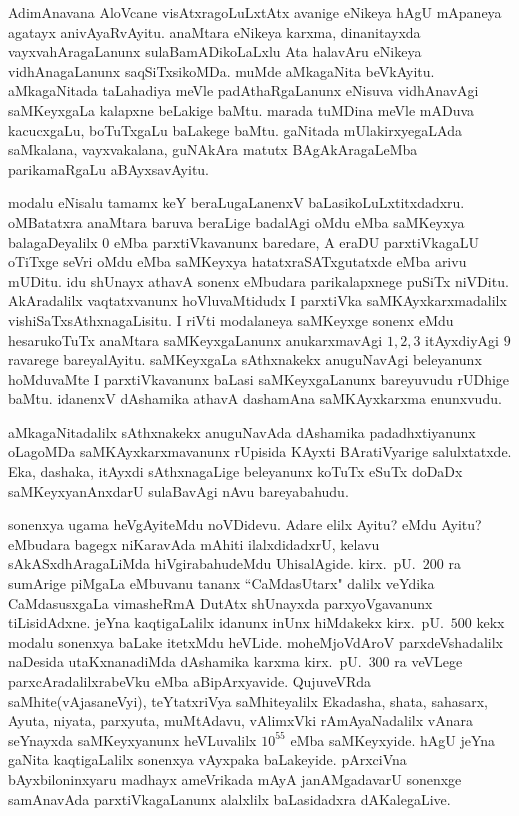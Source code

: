 AdimAnavana AloVcane visAtxragoLuLxtAtx avanige eNikeya hAgU mApaneya agatayx anivAyaRvAyitu. anaMtara eNikeya karxma, dinanitayxda vayxvahAragaLanunx sulaBamADikoLaLxlu Ata halavAru eNikeya vidhAnagaLanunx saqSiTxsikoMDa. muMde aMkagaNita beVkAyitu. aMkagaNitada taLahadiya meVle padAthaRgaLanunx eNisuva vidhAnavAgi saMKeyxgaLa  kalapxne beLakige baMtu. marada tuMDina meVle mADuva kacucxgaLu, boTuTxgaLu baLakege baMtu. gaNitada mUlakirxyegaLAda saMkalana, vayxvakalana, guNAkAra matutx BAgAkAragaLeMba parikamaRgaLu aBAyxsavAyitu.

modalu eNisalu tamamx keY beraLugaLanenxV baLasikoLuLxtitxdadxru. oMBatatxra anaMtara baruva beraLige badalAgi oMdu eMba saMKeyxya balagaDeyalilx $0$ eMba parxtiVkavanunx baredare, A eraDU parxtiVkagaLU oTiTxge seVri oMdu eMba saMKeyxya hatatxraSATxgutatxde eMba arivu  mUDitu. idu shUnayx athavA sonenx eMbudara parikalapxnege puSiTx niVDitu. AkAradalilx vaqtatxvanunx hoVluvaMtidudx I parxtiVka saMKAyxkarxmadalilx vishiSaTxsAthxnagaLisitu. I riVti modalaneya saMKeyxge sonenx eMdu hesarukoTuTx anaMtara saMKeyxgaLanunx anukarxmavAgi $1,2,3$ itAyxdi\-yAgi $9$ ravarege bareyalAyitu. saMKeyxgaLa sAthxnakekx anuguNavAgi beleyanunx hoMdu\-vaMte I parxtiVkavanunx baLasi saMKeyxgaLanunx bareyuvudu rUDhige baMtu. idanenxV dAshamika athavA dashamAna saMKAyxkarxma enunxvudu.

aMkagaNitadalilx sAthxnakekx anuguNavAda dAshamika padadhxtiyanunx oLagoMDa saMKAyxkarxmavanunx rUpisida KAyxti BAratiVyarige salulxtatxde. Eka, dashaka, itAyxdi sAthxnagaLige beleyanunx koTuTx eSuTx doDaDx saMKeyxyanAnxdarU sulaBavAgi nAvu bareyabahudu.

sonenxya ugama heVgAyiteMdu noVDidevu. Adare elilx Ayitu? eMdu Ayitu? eMbudara bagegx niKaravAda mAhiti ilalxdidadxrU, kelavu sAkASxdhAragaLiMda hiVgirabahudeMdu UhisalAgide. kirx.~pU.\ $200$ ra sumArige piMgaLa eMbuvanu tananx ``CaMdasUtarx" dalilx veYdika CaMdasusxgaLa vimasheRmA DutAtx shUnayxda parxyoVgavanunx tiLisidAdxne. jeYna kaqtigaLalilx idanunx inUnx hiMdakekx kirx.~pU.\ $500$ kekx modalu sonenxya baLake itetxMdu heVLide. moheMjoVdAroV parxdeVshadalilx naDesida utaKxnanadiMda dAshamika karxma kirx.~pU.\ $300$ ra veVLege parxcAradalilxrabeVku eMba aBipArxyavide. QujuveVRda saMhite(vAjasaneVyi), teYtatxriVya saMhiteyalilx Ekadasha, shata, sahasarx, Ayuta, niyata, parxyuta, muMtAdavu, vAlimxVki rAmAyaNadalilx vAnara seYnayxda saMKeyxyanunx heVLuvalilx $10^{55}$ eMba saMKeyxyide. hAgU jeYna gaNita kaqtigaLalilx sonenxya vAyxpaka baLakeyide. pArxciVna bAyxbiloninxyaru madhayx ameVrikada mAyA janAMgadavarU sonenxge samAnavAda parxtiVkagaLanunx alalxlilx baLasidadxra dAKalegaLive. 

